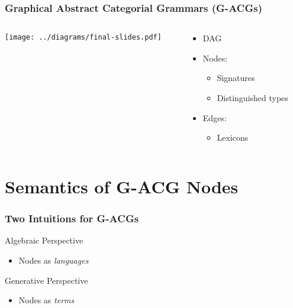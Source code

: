 \documentclass{beamer}
\begin{document}
\begin{frame}
  \frametitle{Graphical Abstract Categorial Grammars (G-ACGs)}

  \begin{columns}[c]
    \begin{column}{0.6\textwidth}
      \begin{center}
        \texttt{[image: ../diagrams/final-slides.pdf]}
      \end{center}
    \end{column}

    \begin{column}{0.4\textwidth}
        \begin{itemize}
        \item DAG
        \item Nodes:
          \begin{itemize}
          \item Signatures
          \item Distinguished types
          \end{itemize}
        \item Edges:
          \begin{itemize}
          \item Lexicons
          \end{itemize}
        \end{itemize}
    \end{column}
  \end{columns}
\end{frame}



\section{Semantics of G-ACG Nodes}

\begin{frame}
  \frametitle{Two Intuitions for G-ACGs}

  \begin{block}{Algebraic Perspective}
    \begin{itemize}
    \item Nodes as \emph{languages}
    \end{itemize}
  \end{block}
  \begin{block}{Generative Perspective}
    \begin{itemize}
    \item Nodes as \emph{terms}
    \end{itemize}
  \end{block}
\end{frame}
\end{document}
